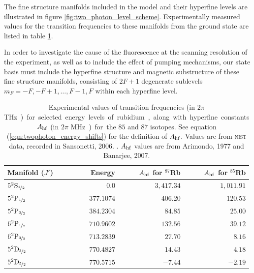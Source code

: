     The fine structure manifolds included in the model and their hyperfine
    levels are illustrated in figure \ref{fig:two_photon_level_scheme}.
    Experimentally measured values for the transition frequencies to these
    manifolds from the ground state are listed in table
    \ref{tab:exp_fine_energies}.

    In order to investigate the cause of the fluorescence at the scanning
    resolution of the experiment, as well as to include the effect of pumping
    mechanisms, our state basis must include the hyperfine structure and
    magnetic substructure of these fine structure manifolds, consisting of $2F +
    1$ degenerate sublevels $m_F = -F, -F + 1, \dots, F -1, F$ within each
    hyperfine level.

    \begin{table}
      \centering
      \begin{tabular}{ l r r r }
        \hline
        Manifold ($J'$) & Energy & $A_{\rm{hf}}$ for $^{87}$Rb 
          & $A_{\rm{hf}}$ for $^{85}$Rb \\
        \hline      
        $5^2\rm{S}_{\nicefrac{1}{2}}$ & $0.0$ & $3,417.34$ & $1,011.91$ \\
        \noalign{\medskip}
        $5^2\rm{P}_{\nicefrac{1}{2}}$ & $377.1074$ & $406.20$ & $120.53$ \\
        $5^2\rm{P}_{\nicefrac{3}{2}}$ & $384.2304$ & $84.85$ & $25.00$ \\
        \noalign{\medskip}
        $6^2\rm{P}_{\nicefrac{1}{2}}$ & $710.9602$ & $132.56$ & $39.12$ \\
        $6^2\rm{P}_{\nicefrac{3}{2}}$ & $713.2839$ & $27.70 $ & $8.16$ \\
        \noalign{\medskip}
        $5^2\rm{D}_{\nicefrac{3}{2}}$ & $770.4827$ & $14.43$ & $4.18$ \\
        $5^2\rm{D}_{\nicefrac{5}{2}}$ & $770.5715$ & $−7.44$ & $-2.19$ \\
        \hline  
      \end{tabular}
      \caption{
      Experimental values of transition frequencies (in \unit{$2\pi$ THz}) for
      selected energy levels of rubidium, along with hyperfine constants
      $A_{\rm{hf}}$ (in \unit{$2\pi$ MHz}) for the $85$ and $87$ isotopes. See
      equation (\ref{eqn:twophoton_energy_shifts}) for the definition of
      $A_{\rm{hf}}$. Values are from \textsc{nist} data, recorded in Sansonetti,
      2006. \cite{Sansonetti2006}. $A_{\rm{hf}}$ values are from Arimondo, 1977
      and Banarjee, 2007.\cite{Arimondo1977, Banerjee2007}
      }
      \label{tab:exp_fine_energies}
    \end{table}

